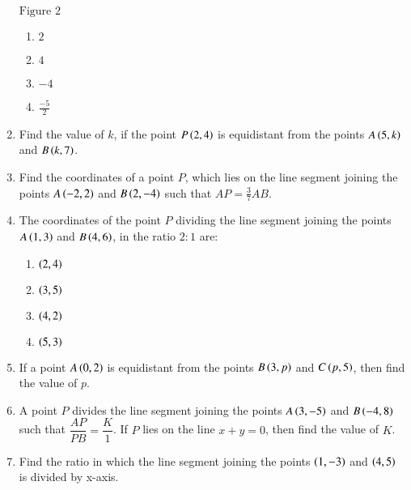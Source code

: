 \begin{enumerate}
\begin{figure} [h]
\begin{tikzpicture}
\end{tikzpicture}
\end{figure}
\begin{center}
$\text{Figure } 2$
\end{center}
\begin{enumerate}
\item $2$\\
\item $4$\\
\item $-4$\\
\item $\frac{-5}{2}$\\
\end{enumerate}
\item Find the value of $k$, if the point $P\brak{2,4}$ is equidistant from the points $A\brak{5,k}$ and $B\brak{k,7}$.\\
\item Find the coordinates of a point $P$, which lies on the line segment joining the points $A\brak{-2,2}$ and $B\brak{2,-4}$ such that $AP = \frac{3}{7} AB$.\\
\item The coordinates of the point $P$ dividing the line segment joining the points $A\brak{1,3}$ and $B\brak{4,6}$, in the ratio $2:1$ are:\\
\begin{enumerate}
\item $\brak{2,4}$\\
\item $\brak{3,5}$\\
\item $\brak{4,2}$\\
\item $\brak{5,3}$\\
\end{enumerate}
\item If a point $A\brak{0,2}$ is equidistant from the points $B\brak{3,p}$ and $C\brak{p,5}$, then find the value of $p$.\\
\item A point $P$ divides the line segment joining the points $A\brak{3,-5}$ and $B\brak{-4,8}$ such that $\dfrac{AP}{PB} = \dfrac{K}{1}$. If $P$ lies on the line $x + y = 0$, then find the value of $K$.\\
\item Find the ratio in which the line segment joining the points $\brak{1,-3}$ and $\brak{4,5}$ is divided by x-axis.\\

\end{enumerate}
